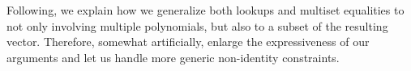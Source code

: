 Following, we explain how we generalize both lookups and multiset equalities to not only involving multiple polynomials, but also to a subset of the resulting vector. Therefore, somewhat artificially, enlarge the expressiveness of our arguments and let us handle more generic non-identity constraints.
%
%
